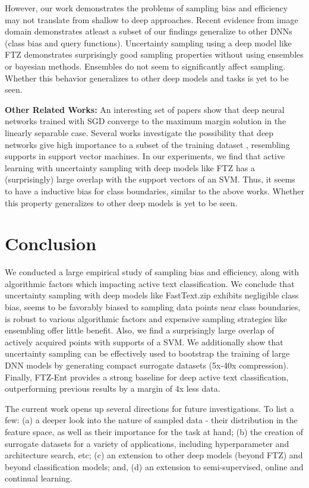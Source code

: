 \documentclass[11pt,a4paper]{article}
\begin{document}
However, our work demonstrates the problems of sampling bias and efficiency may not translate from shallow to deep approaches.  Recent evidence from image domain \cite{gissin2019discriminative} demonstrates atleast a subset of our findings generalize to other DNNs (class bias and query functions). Uncertainty sampling using a deep model like FTZ demonstrates surprisingly good sampling properties without using ensembles or bayesian methods. Ensembles do not seem to significantly affect sampling. Whether this behavior generalizes to other deep models and tasks is yet to be seen. 


\textbf{Other Related Works:} An interesting set of papers \cite{soudry2018implicit, xu2018convergence} show that deep neural networks trained with SGD converge to the maximum margin solution in the linearly separable case. Several works investigate the possibility that deep networks give high importance to a subset of the training dataset \cite{toneva19example, vodrahalli2018all, birodkar2019semantic}, resembling supports in support vector machines. In our experiments, we find that active learning with uncertainty sampling with deep models like FTZ has a (surprisingly) large overlap with the support vectors of an SVM. Thus, it seems to have a inductive bias for class boundaries, similar to the above works. Whether this property generalizes to other deep models is yet to be seen.  \section{Conclusion}\label{sec:conclusion}

We conducted a large empirical study of sampling bias and efficiency, along with algorithmic factors which impacting active text classification. We conclude that uncertainty sampling with deep models like FastText.zip exhibits negligible class bias, seems to be favorably biased to sampling data points near class boundaries, is robust to various algorithmic factors and expensive sampling strategies like ensembling offer little benefit. Also, we find a surprisingly large overlap of actively acquired points with supports of a SVM. We additionally show that uncertainty sampling can be effectively used to bootstrap the training of large DNN models by generating compact surrogate datasets (5x-40x compression). Finally, FTZ-Ent provides a strong baseline for deep active text classification, outperforming previous results by a margin of 4x less data.   

The current work opens up several directions for future investigations. To list a few: (a) a deeper look into the nature of sampled data - their distribution in the feature space, as well as their importance for the task at hand; (b) the creation of surrogate datasets for a variety of applications, including hyperparameter and architecture search, etc; (c) an extension to other deep models (beyond FTZ) and beyond classification models; and, (d) an extension to semi-supervised, online and continual learning.\\ 
\end{document}
